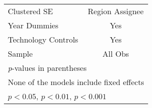 {\begin{longtable}{l*{1}{c}}
Clustered SE       &Region Assignee         \\
Year Dummies            &      Yes         \\
Technology Controls            &      Yes         \\
Sample          &  All Obs         \\
\hline\hline
\multicolumn{2}{l}{\footnotesize \textit{p}-values in parentheses}\\
\multicolumn{2}{l}{\footnotesize None of the models include fixed effects}\\
\multicolumn{2}{l}{\footnotesize \sym{*} \(p<0.05\), \sym{**} \(p<0.01\), \sym{***} \(p<0.001\)}\\
\end{longtable}
}
